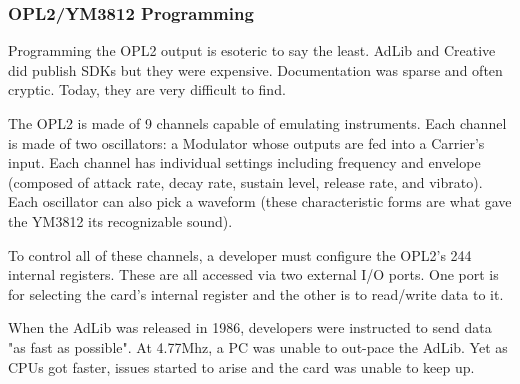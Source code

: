 \subsubsection{OPL2/YM3812 Programming}
\label{IMF_explanation}
\par
Programming the OPL2 output is esoteric to say the least. AdLib and Creative did publish SDKs but they were expensive.  Documentation was sparse and often cryptic. Today, they are very difficult to find.\\
\par
The OPL2 is made of 9 channels capable of emulating instruments. Each channel is made of two oscillators: a Modulator whose outputs are fed into a Carrier's input. Each channel has individual settings including frequency and envelope (composed of attack rate, decay rate, sustain level, release rate, and vibrato). Each oscillator can also pick a waveform (these characteristic forms are what gave the YM3812 its recognizable sound).\\
\par
 To control all of these channels, a developer must configure the OPL2's 244 internal registers. These are all accessed via two external I/O ports. One port is for selecting the card's internal register and the other is to read/write data to it.\\
\par
\begin{minipage}{\textwidth}

\end{minipage}
\par
When the AdLib was released in 1986, developers were instructed to send data "as fast as possible". At 4.77Mhz, a PC was unable to out-pace the AdLib. Yet as CPUs got faster, issues started to arise and the card was unable to keep up.\\
\par

